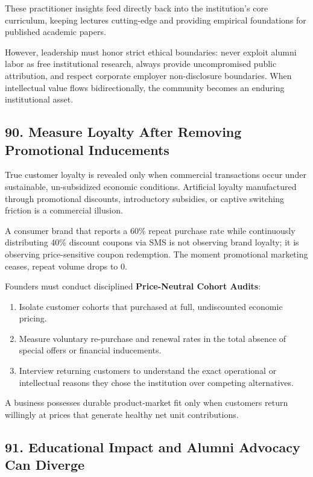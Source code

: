 These practitioner insights feed directly back into the institution's core curriculum, keeping lectures cutting-edge and providing empirical foundations for published academic papers. 

However, leadership must honor strict ethical boundaries: never exploit alumni labor as free institutional research, always provide uncompromised public attribution, and respect corporate employer non-disclosure boundaries. When intellectual value flows bidirectionally, the community becomes an enduring institutional asset.

\subsection*{90. Measure Loyalty After Removing Promotional Inducements}

True customer loyalty is revealed only when commercial transactions occur under sustainable, un-subsidized economic conditions. Artificial loyalty manufactured through promotional discounts, introductory subsidies, or captive switching friction is a commercial illusion.

A consumer brand that reports a 60\% repeat purchase rate while continuously distributing 40\% discount coupons via SMS is not observing brand loyalty; it is observing price-sensitive coupon redemption. The moment promotional marketing ceases, repeat volume drops to 0.

Founders must conduct disciplined \textbf{Price-Neutral Cohort Audits}:
\begin{enumerate}[leftmargin=*]
\item Isolate customer cohorts that purchased at full, undiscounted economic pricing.
\item Measure voluntary re-purchase and renewal rates in the total absence of special offers or financial inducements.
\item Interview returning customers to understand the exact operational or intellectual reasons they chose the institution over competing alternatives.
\end{enumerate}

A business possesses durable product-market fit only when customers return willingly at prices that generate healthy net unit contributions.

\subsection*{91. Educational Impact and Alumni Advocacy Can Diverge}

